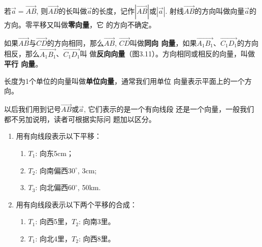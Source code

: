 若$\vec{a}=\Vec{AB}$, 则$\Vec{AB}$的长叫做$\vec{a}$的长度，记作$|\Vec{AB}|$或$|\vec{a}|$.
射线$\Vec{AB}$的方向叫做向量$\vec{a}$的方向。零平移又叫做\textbf{零向量}，它
的方向不确定。

如果$\Vec{AB}$与$\Vec{CD}$的方向相同，那么$\Vec{AB}$, $\Vec{CD}$叫做\textbf{同向
向量}，如果$\Vec{A_1B_1}$、$\Vec{C_1D_1}$的方向相反，那么$\Vec{A_1B_1}$、$\Vec{C_1D_1}$叫
做\textbf{反向向量}（图3.11）。方向相同或相反的向量，叫做\textbf{平行
向量}。
\begin{figure}[htp]
    \centering
{}
    \caption{}
\end{figure}

长度为1个单位的向量叫做\textbf{单位向量}，通常我们用单位
向量表示平面上的一个方向。

以后我们用到记号$\Vec{AB}$或$\vec{a}$, 它们表示的是一个有向线段
还是一个向量，一般我们都不另加说明，读者可根据实际问
题加以区分。

\begin{ex}
\begin{enumerate}
    \item 用有向线段表示以下平移：
\begin{enumerate}
    \item $T_1$: 向东5cm；
    \item $T_2$: 向南偏西$30^{\circ}$, 3cm;
    \item $T_3$: 向北偏西$60^{\circ}$, 50km.
\end{enumerate}
\item  用有向线段表示以下两个平移的合成：
\begin{enumerate}
    \item $T_1$: 向西5里，$T_2$: 向南3里。
    \item $T_1$: 向北4里，$T_2$: 向西8里。
\end{enumerate}
\end{enumerate}
\end{ex}

